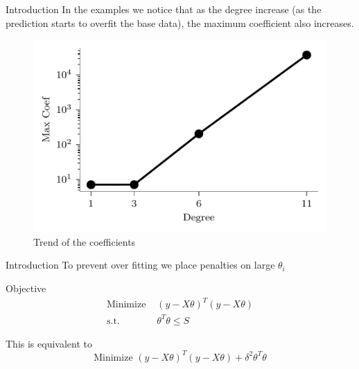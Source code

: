 \documentclass{beamer}
\begin{document}
\begin{frame}{Introduction}
\vspace{0.4cm}
In the examples we notice that as the degree increase (as the prediction starts to overfit the base data), the maximum coefficient also increases.
\begin{figure}\includegraphics[width=0.7\linewidth]{ridge/lin_plot_coef.pdf}\caption{Trend of the coefficients}\end{figure}

\end{frame}
 
\begin{frame}{Introduction}
\vspace{0.4cm}
To prevent over fitting we place penalties on large $\theta_i$
\pause
 \\ \bigskip
\begin{tcolorbox}{Objective}
\begin{align*}
\text{Minimize } & \left(y-X\theta\right)^T\left(y-X\theta\right) \\
\text{s.t. } & \theta ^T\theta \leq S
\end{align*}
\end{tcolorbox}
\pause
This is equivalent to \vspace{-0.4cm}
$$
\text{Minimize } \left(y-X\theta\right)^T\left(y-X\theta\right) + \delta ^2\theta ^T\theta
$$
\end{frame}  
\end{document}
